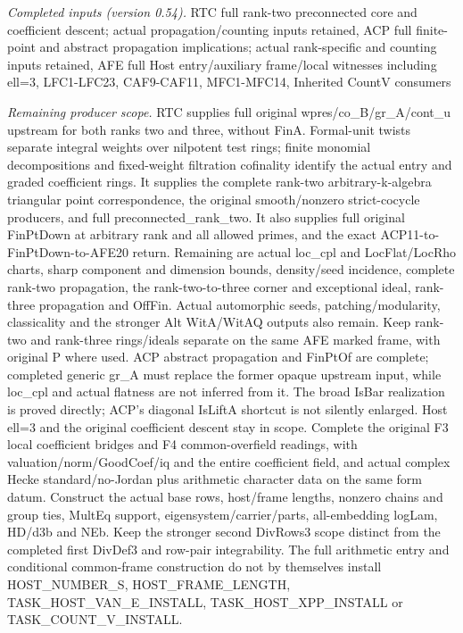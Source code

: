 \documentclass[11pt,a4paper]{article}
\numberwithin{equation}{section}
\theoremstyle{remark}\newtheorem{remark}[theorem]{Remark}
\begin{document}
\emph{Completed inputs (version 0.54).} RTC full rank-two preconnected core and coefficient descent; actual propagation/counting inputs retained, ACP full finite-point and abstract propagation implications; actual rank-specific and counting inputs retained, AFE full Host entry/auxiliary frame/local witnesses including ell=3, LFC1-LFC23, CAF9-CAF11, MFC1-MFC14, Inherited CountV consumers

\emph{Remaining producer scope.} RTC supplies full original wpres/co\_\allowbreak B/gr\_\allowbreak A/cont\_\allowbreak u upstream for both ranks two and three, without FinA. Formal-unit twists separate integral weights over nilpotent test rings; finite monomial decompositions and fixed-weight filtration cofinality identify the actual entry and graded coefficient rings. It supplies the complete rank-two arbitrary-k-algebra triangular point correspondence, the original smooth/nonzero strict-cocycle producers, and full preconnected\_\allowbreak rank\_\allowbreak two. It also supplies full original FinPtDown at arbitrary rank and all allowed primes, and the exact ACP11-to-FinPtDown-to-AFE20 return. Remaining are actual loc\_\allowbreak cpl and LocFlat/LocRho charts, sharp component and dimension bounds, density/seed incidence, complete rank-two propagation, the rank-two-to-three corner and exceptional ideal, rank-three propagation and OffFin. Actual automorphic seeds, patching/modularity, classicality and the stronger Alt WitA/WitAQ outputs also remain. Keep rank-two and rank-three rings/ideals separate on the same AFE marked frame, with original P where used. ACP abstract propagation and FinPtOf are complete; completed generic gr\_\allowbreak A must replace the former opaque upstream input, while loc\_\allowbreak cpl and actual flatness are not inferred from it. The broad IsBar realization is proved directly; ACP’s diagonal IsLiftA shortcut is not silently enlarged. Host ell=3 and the original coefficient descent stay in scope. Complete the original F3 local coefficient bridges and F4 common-overfield readings, with valuation/norm/GoodCoef/iq and the entire coefficient field, and actual complex Hecke standard/no-Jordan plus arithmetic character data on the same form datum. Construct the actual base rows, host/frame lengths, nonzero chains and group ties, MultEq support, eigensystem/carrier/parts, all-embedding logLam, HD/d3b and NEb. Keep the stronger second DivRows3 scope distinct from the completed first DivDef3 and row-pair integrability. The full arithmetic entry and conditional common-frame construction do not by themselves install HOST\_\allowbreak NUMBER\_\allowbreak S, HOST\_\allowbreak FRAME\_\allowbreak LENGTH, TASK\_\allowbreak HOST\_\allowbreak VAN\_\allowbreak E\_\allowbreak INSTALL, TASK\_\allowbreak HOST\_\allowbreak XPP\_\allowbreak INSTALL or TASK\_\allowbreak COUNT\_\allowbreak V\_\allowbreak INSTALL.
\end{document}
